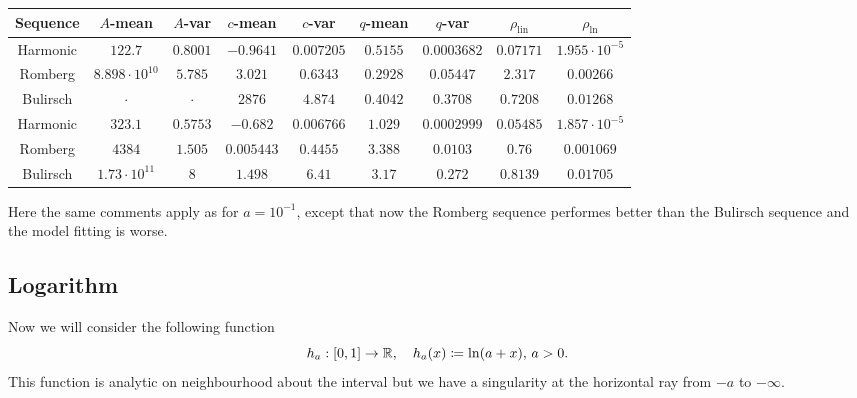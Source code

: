\begin{table}[H]
    \centering
    \small
    \begin{tabular}{c||c|c|c|c|c|c|c|c}
Sequence & \(A\)-mean & \(A\)-var & \(c\)-mean & \(c\)-var & \(q\)-mean & \(q\)-var & \(\rho_{\operatorname{lin}}\) & \(\rho_{\ln}\)\\\hline
\rowcolor{red}
Harmonic & \(122.7\) & \(0.8001\) & \(-0.9641\) & \(0.007205\) & \(0.5155\) & \(0.0003682\) & \(0.07171\) & \(1.955\cdot 10^{-5}\) \\
\rowcolor{red}
Romberg & \(8.898\cdot 10^{10}\) & \(5.785\) & \(3.021\) & \(0.6343\) & \(0.2928\) & \(0.05447\) & \(2.317\) & \(0.00266\) \\
\rowcolor{red}
Bulirsch & \(\cdot\) & \(\cdot\) & \(2876\) & \(4.874\) & \(0.4042\) & \(0.3708\) & \(0.7208\) & \(0.01268\) \\
\rowcolor{red}
Harmonic & \(323.1\) & \(0.5753\) & \(-0.682\) & \(0.006766\) & \(1.029\) & \(0.0002999\) & \(0.05485\) & \(1.857\cdot 10^{-5}\) \\
\rowcolor{yellow}
Romberg & \(4384\) & \(1.505\) & \(0.005443\) & \(0.4455\) & \(3.388\) & \(0.0103\) & \(0.76\) & \(0.001069\) \\
\rowcolor{red}
Bulirsch & \(1.73\cdot 10^{11}\) & \(8\) & \(1.498\) & \(6.41\) & \(3.17\) & \(0.272\) & \(0.8139\) & \(0.01705\) \\
    \end{tabular}
    \label{tab:my_label}
\end{table}

Here the same comments apply as for \(a = 10^{-1}\), except that now the Romberg sequence performes better than the Bulirsch sequence and the model fitting is worse. 

\subsection{Logarithm}

Now we will consider the following function 
\[
h_a: [0, 1] \rightarrow \mathbb{R}, \quad h_a(x) \coloneqq \ln(a + x),\, a > 0.
\]
This function is analytic on neighbourhood about the interval but we have a singularity at the horizontal ray from \(-a\) to \(-\infty\).

